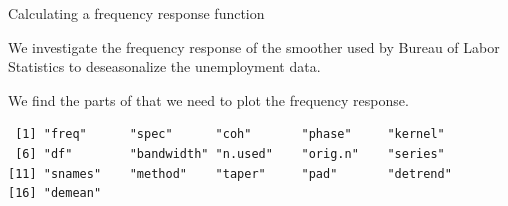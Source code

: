 \begin{frame}[fragile]{Calculating a frequency response function}


\bi
\item We investigate the frequency response of the smoother used by Bureau of Labor Statistics to deseasonalize the unemployment data.
\ei

\begin{knitrout}\small
{}\color{fgcolor}\begin{kframe}
\begin{alltt}
 \hlkwb{<-} \hlstd{(}\hlstd{=}\hlstd{)}
\end{alltt}
\end{kframe}
\end{knitrout}

\bi
\item We find the parts of  that we need to plot the frequency response.
\ei

\begin{knitrout}\small
{}\color{fgcolor}\begin{kframe}
\begin{alltt}
\end{alltt}
\end{kframe}
\end{knitrout}


\begin{knitrout}\small
{}\color{fgcolor}\begin{kframe}
\begin{verbatim}
 [1] "freq"      "spec"      "coh"       "phase"     "kernel"   
 [6] "df"        "bandwidth" "n.used"    "orig.n"    "series"   
[11] "snames"    "method"    "taper"     "pad"       "detrend"  
[16] "demean"   
\end{verbatim}
\end{kframe}
\end{knitrout}



\end{frame}
